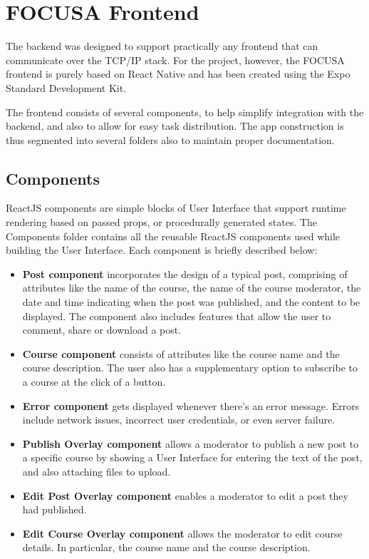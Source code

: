 \section{FOCUSA Frontend}
The backend was designed to support practically any frontend that can communicate over the TCP/IP stack.
For the project, however, the FOCUSA frontend is purely based on React Native and has been created using the Expo Standard Development Kit. 

The frontend consists of several components, to help simplify integration with the backend, 
and also to allow for easy task distribution. The app construction is thus segmented into several folders also to maintain proper documentation.

\subsection{Components}
ReactJS components are simple blocks of User Interface that support runtime rendering based on passed props, 
or procedurally generated states.
The Components folder contains all the reusable ReactJS components used while building the User Interface. 
Each component is briefly described below:
\begin{itemize}
    \item \textbf{Post component} incorporates the design of a typical post, comprising of attributes like the name of the course, the name of the course moderator, the date and time indicating when the post was published, and the content to be displayed. The component also includes features that allow the user to comment, share or download a post.
    \item \textbf{Course component} consists of attributes like the course name and the course description. 
    The user also has a supplementary option to subscribe to a course at the click of a button.
    \item \textbf{Error component} gets displayed whenever there's an error message. Errors include network issues, 
    incorrect user credentials, or even server failure.
    \item \textbf{Publish Overlay component} allows a moderator to publish a new post to a specific course by showing a 
    User Interface for entering the text of the post, and also attaching files to upload.
    \item \textbf{Edit Post Overlay component} enables a moderator to edit a post they had published.
    \item \textbf{Edit Course Overlay component} allows the moderator to edit course details. In particular, the course name and the course description.
\end{itemize}

